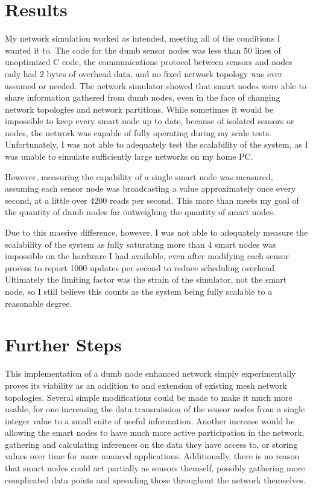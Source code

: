 \documentclass{article}
\begin{document}
\section{Results}

My network simulation worked as intended, meeting all of the conditions I wanted it to. The code for the dumb sensor nodes was less than 50 lines of unoptimized C code, the communications protocol between sensors and nodes only had 2 bytes of overhead data, and no fixed network topology was ever assumed or needed. The network simulator showed that smart nodes were able to share information gathered from dumb nodes, even in the face of changing network topologies and network partitions. While sometimes it would be impossible to keep every smart node up to date, because of isolated sensors or nodes, the network was capable of fully operating during my scale tests. Unfortunately, I was not able to adequately test the scalability of the system, as I was unable to simulate sufficiently large networks on my home PC.

However, measuring the capability of a single smart node was measured, assuming each sensor node was broadcasting a value approximately once every second, at a little over 4200 reads per second. This more than meets my goal of the quantity of dumb nodes far outweighing the quantity of smart nodes. 

Due to this massive difference, however, I was not able to adequately measure the scalability of the system as fully saturating more than 4 smart nodes was impossible on the hardware I had available, even after modifying each sensor process to report 1000 updates per second to reduce scheduling overhead. Ultimately the limiting factor was the strain of the simulator, not the smart node, so I still believe this counts as the system being fully scalable to a reasonable degree. 

\section{Further Steps}

This implementation of a dumb node enhanced network simply experimentally proves its viability as an addition to and extension of existing mesh network topologies. Several simple modifications could be made to make it much more usable, for one increasing the data transmission of the sensor nodes from a single integer value to a small suite of useful information. Another increase would be allowing the smart nodes to have much more active participation in the network, gathering and calculating inferences on the data they have access to, or storing values over time for more nuanced applications. Additionally, there is no reason that smart nodes could act partially as sensors themself, possibly gathering more complicated data points and spreading those throughout the network themselves.
\end{document}
